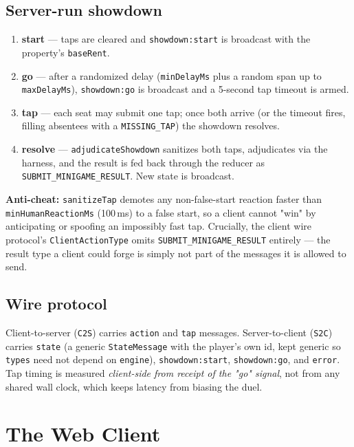 \documentclass[11pt,a4paper]{article}
\newcommand{\code}[1]{\texttt{#1}}
\begin{document}
\subsection{Server-run showdown}
\begin{enumerate}[leftmargin=1.6em,nosep]
  \item \textbf{start} --- taps are cleared and \code{showdown:start} is
        broadcast with the property's \code{baseRent}.
  \item \textbf{go} --- after a randomized delay (\code{minDelayMs} plus a
        random span up to \code{maxDelayMs}), \code{showdown:go} is broadcast
        and a 5-second tap timeout is armed.
  \item \textbf{tap} --- each seat may submit one tap; once both arrive (or the
        timeout fires, filling absentees with a \code{MISSING\_TAP}) the
        showdown resolves.
  \item \textbf{resolve} --- \code{adjudicateShowdown} sanitizes both taps,
        adjudicates via the harness, and the result is fed back through the
        reducer as \code{SUBMIT\_MINIGAME\_RESULT}. New state is broadcast.
\end{enumerate}
\textbf{Anti-cheat:} \code{sanitizeTap} demotes any non-false-start reaction
faster than \code{minHumanReactionMs} (100\,ms) to a false start, so a client
cannot "win" by anticipating or spoofing an impossibly fast tap. Crucially, the
client wire protocol's \code{ClientActionType} omits
\code{SUBMIT\_MINIGAME\_RESULT} entirely --- the result type a client could forge
is simply not part of the messages it is allowed to send.

\subsection{Wire protocol}
Client-to-server (\code{C2S}) carries \code{action} and \code{tap} messages.
Server-to-client (\code{S2C}) carries \code{state} (a generic
\code{StateMessage} with the player's own id, kept generic so \code{types} need
not depend on \code{engine}), \code{showdown:start}, \code{showdown:go}, and
\code{error}. Tap timing is measured \emph{client-side from receipt of the "go"
signal}, not from any shared wall clock, which keeps latency from biasing the
duel.

\section{The Web Client}
\end{document}
